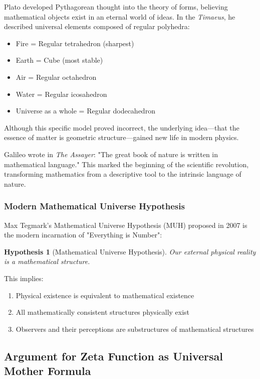 \documentclass[12pt]{article}
\theoremstyle{plain}
\newtheorem{hypothesis}[theorem]{Hypothesis}
\theoremstyle{definition}
\begin{document}
Plato developed Pythagorean thought into the theory of forms, believing mathematical objects exist in an eternal world of ideas. In the \emph{Timaeus}, he described universal elements composed of regular polyhedra:
\begin{itemize}
\item Fire = Regular tetrahedron (sharpest)
\item Earth = Cube (most stable)
\item Air = Regular octahedron
\item Water = Regular icosahedron
\item Universe as a whole = Regular dodecahedron
\end{itemize}

Although this specific model proved incorrect, the underlying idea—that the essence of matter is geometric structure—gained new life in modern physics.

Galileo wrote in \emph{The Assayer}: "The great book of nature is written in mathematical language." This marked the beginning of the scientific revolution, transforming mathematics from a descriptive tool to the intrinsic language of nature.

\subsubsection{Modern Mathematical Universe Hypothesis}

Max Tegmark's Mathematical Universe Hypothesis (MUH) proposed in 2007 is the modern incarnation of "Everything is Number":

\begin{hypothesis}[Mathematical Universe Hypothesis]
Our external physical reality is a mathematical structure.
\end{hypothesis}

This implies:
\begin{enumerate}
\item Physical existence is equivalent to mathematical existence
\item All mathematically consistent structures physically exist
\item Observers and their perceptions are substructures of mathematical structures
\end{enumerate}

\subsection{Argument for Zeta Function as Universal Mother Formula}
\end{document}
